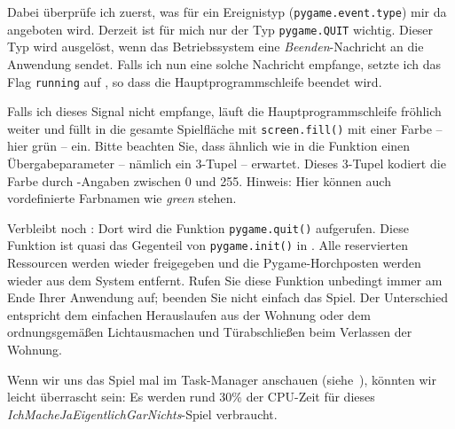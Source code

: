Dabei überprüfe ich zuerst, was für ein Ereignistyp (\texttt{pygame.event.type}) mir da angeboten wird. Derzeit ist für mich nur der Typ \texttt{pygame.QUIT} wichtig. Dieser Typ wird ausgelöst, wenn das Betriebssystem eine \emph{Beenden}-Nachricht an die Anwendung sendet. Falls ich nun eine solche Nachricht empfange, setzte ich das Flag \texttt{running} auf \false{}, so dass die Hauptprogrammschleife beendet wird.

Falls ich dieses Signal nicht empfange, läuft die Hauptprogrammschleife fröhlich weiter und füllt in  die gesamte Spielfläche mit \texttt{screen.fill()} mit einer Farbe -- hier grün -- ein. Bitte beachten Sie, dass ähnlich wie in  die Funktion einen Übergabeparameter -- nämlich ein 3-Tupel -- erwartet. Dieses 3-Tupel kodiert die Farbe durch -Angaben zwischen 0 und 255. Hinweis: Hier können auch vordefinierte Farbnamen wie \emph{green} stehen.


Verbleibt noch : Dort wird die Funktion \texttt{pygame.quit()} aufgerufen. Diese Funktion ist quasi das Gegenteil von \texttt{pygame.init()} in . Alle reservierten Ressourcen werden wieder freigegeben und die Pygame-Horchposten werden wieder aus dem System entfernt. Rufen Sie diese Funktion unbedingt immer am Ende Ihrer Anwendung auf; beenden Sie nicht einfach das Spiel. Der Unterschied entspricht dem einfachen Herauslaufen aus der Wohnung oder dem ordnungsgemäßen Lichtausmachen und Türabschließen beim Verlassen der Wohnung.  

Wenn wir uns das Spiel mal im Task-Manager anschauen (siehe~), könnten wir leicht überrascht sein: Es werden rund 30\% der CPU-Zeit für dieses \emph{IchMacheJaEigentlichGarNichts}-Spiel verbraucht. 

